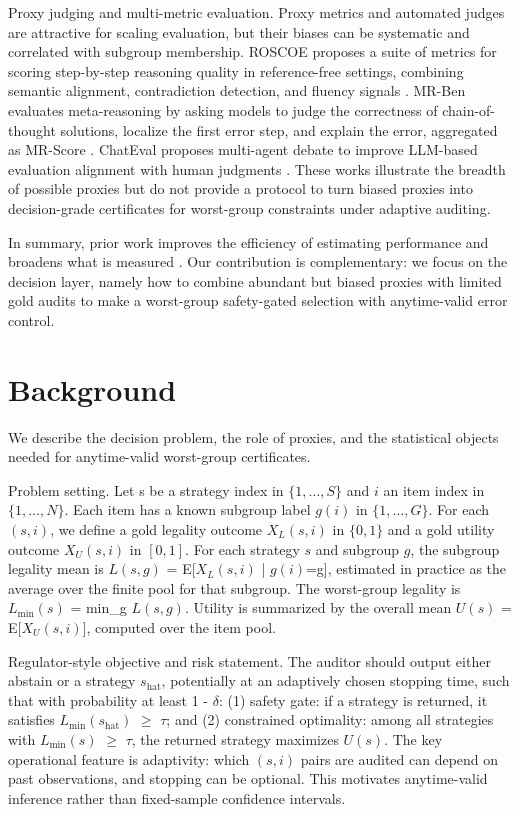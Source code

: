 \documentclass{article} %
\begin{document}
Proxy judging and multi-metric evaluation. Proxy metrics and automated judges are attractive for scaling evaluation, but their biases can be systematic and correlated with subgroup membership. ROSCOE proposes a suite of metrics for scoring step-by-step reasoning quality in reference-free settings, combining semantic alignment, contradiction detection, and fluency signals \cite{golovneva-2022-roscoe}. MR-Ben evaluates meta-reasoning by asking models to judge the correctness of chain-of-thought solutions, localize the first error step, and explain the error, aggregated as MR-Score \cite{zeng-2024-ben}. ChatEval proposes multi-agent debate to improve LLM-based evaluation alignment with human judgments \cite{chan-2023-chateval}. These works illustrate the breadth of possible proxies but do not provide a protocol to turn biased proxies into decision-grade certificates for worst-group constraints under adaptive auditing.

In summary, prior work improves the efficiency of estimating performance and broadens what is measured \cite{polo-2024-tinybenchmarks,polo-2024-efficient,duan-2024-gtbench,liu-2023-agentbench,ma-2024-agentboard}. Our contribution is complementary: we focus on the decision layer, namely how to combine abundant but biased proxies with limited gold audits to make a worst-group safety-gated selection with anytime-valid error control.

\section{Background}
\label{sec:background}
We describe the decision problem, the role of proxies, and the statistical objects needed for anytime-valid worst-group certificates.

Problem setting. Let s be a strategy index in $\{1,\ldots,S\}$ and $i$ an item index in $\{1,\ldots,N\}$. Each item has a known subgroup label $g(i)$ in $\{1,\ldots,G\}$. For each $(s,i)$, we define a gold legality outcome $X_L(s,i)$ in $\{0,1\}$ and a gold utility outcome $X_U(s,i)$ in $[0,1]$. For each strategy $s$ and subgroup $g$, the subgroup legality mean is $L(s,g)$ = E[$X_L(s,i)$ | $g(i)$=g], estimated in practice as the average over the finite pool for that subgroup. The worst-group legality is $L_{\min}(s)$ = min_g $L(s,g)$. Utility is summarized by the overall mean $U(s)$ = E[$X_U(s,i)$], computed over the item pool.

Regulator-style objective and risk statement. The auditor should output either abstain or a strategy $s_{\text{hat}}$, potentially at an adaptively chosen stopping time, such that with probability at least 1 - \ensuremath{\delta}: (1) safety gate: if a strategy is returned, it satisfies $L_{\min}(s_{\text{hat}})$ \ensuremath{\geq} \ensuremath{\tau}; and (2) constrained optimality: among all strategies with $L_{\min}(s)$ \ensuremath{\geq} \ensuremath{\tau}, the returned strategy maximizes $U(s)$. The key operational feature is adaptivity: which $(s,i)$ pairs are audited can depend on past observations, and stopping can be optional. This motivates anytime-valid inference rather than fixed-sample confidence intervals.
\end{document}
